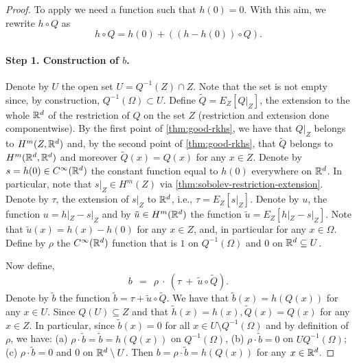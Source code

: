 \begin{proof}

To apply \citet{bourdaud2011composition} we need a function such that $h(0) = 0$. With this aim, we rewrite $h \circ Q$ as
$$h \circ Q = h(0) + ((h-h(0)) \circ Q).$$
\paragraph{Step 1. Construction of $b$.} Denote by $U$ the open set $U = Q^{-1}(Z) \cap Z$. Note that the set is not empty since, by construction, $Q^{-1}(\Omega) \subset U$.
Define $\tilde{Q} = E_{Z}[Q|_{Z}]$, the extension to the whole $\mathbb R^d$ of the restriction of $Q$ on the set $Z$ (restriction and extension done componentwise). By the first point of \cref{thm:good-rkhs}, we have that $Q|_{Z}$ belongs to $H^m(Z,\mathbb R^d)$ and, by the second point of \cref{thm:good-rkhs}, that $\tilde{Q}$ belongs to $H^m(\mathbb R^d, \mathbb R^d)$ and moreover $\tilde{Q}(x) = Q(x)$ for any $x \in Z$.
Denote by $s = h(0) \in C^\infty(\mathbb R^d)$ the constant function equal to $h(0)$ everywhere on $\mathbb R^d$. In particular, note that $s|_Z \in H^m(Z)$ via \cref{thm:sobolev-restriction-extension}. Denote by $\tau$, the extension of $s|_Z$ to $\mathbb R^d$, i.e., $\tau = E_Z[s|_Z]$. Denote by $u$, the function $u = h|_Z - s|_Z$ and by $\tilde{u} \in H^m(\mathbb R^d)$ the function $\tilde{u} = E_{Z}[h|_Z - s|_Z]$. Note that $\tilde{u}(x) = h(x) - h(0)$ for any
$x \in Z$, and, in particular for any $x \in \Omega$. Define by $\rho$ the $C^\infty(\mathbb R^d)$ function that is $1$ on $Q^{-1}(\Omega)$ and $0$ on $\mathbb R^d \subseteq U$.

Now define,
$$b ~~=~~ \rho ~\cdot~ (\tau ~+~ \tilde{u} \circ \tilde{Q}).$$
Denote by $\tilde{b}$ the function $\tilde{b} = \tau + \tilde{u} \circ \tilde{Q}$. We have that $\tilde{b}(x) = h(Q(x))$ for any $x \in U$. Since $Q(U) \subseteq Z$ and that $\tilde{h}(x) = h(x), \tilde{Q}(x) = Q(x)$ for any $x \in Z$. In particular, since $\tilde{b}(x) = 0$ for all $x \in U \setminus Q^{-1}(\Omega)$ and by definition of $\rho$, we have: (a)  $\rho \cdot \tilde{b} = \tilde{b} = h(Q(x))$ on $Q^{-1}(\Omega)$, (b) $\rho \cdot \tilde{b} = 0$ on $U Q^{-1}(\Omega)$; (c) $\rho \cdot \tilde{b} = 0$ and $0$ on $\mathbb R^d \setminus U$. Then $b = \rho \cdot \tilde{b} = h(Q(x))$ for any $x \in \mathbb R^d$.




\end{proof}
